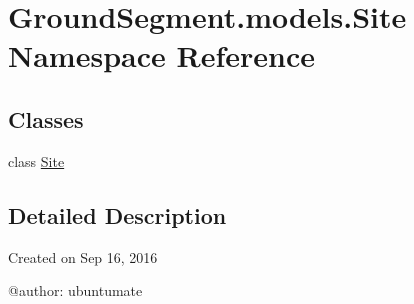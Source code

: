 \hypertarget{namespace_ground_segment_1_1models_1_1_site}{}\section{Ground\+Segment.\+models.\+Site Namespace Reference}
\label{namespace_ground_segment_1_1models_1_1_site}
\subsection*{Classes}
\begin{DoxyCompactItemize}
\item 
class \hyperlink{class_ground_segment_1_1models_1_1_site_1_1_site}{Site}
\end{DoxyCompactItemize}


\subsection{Detailed Description}
\begin{DoxyVerb}Created on Sep 16, 2016

@author: ubuntumate
\end{DoxyVerb}
 